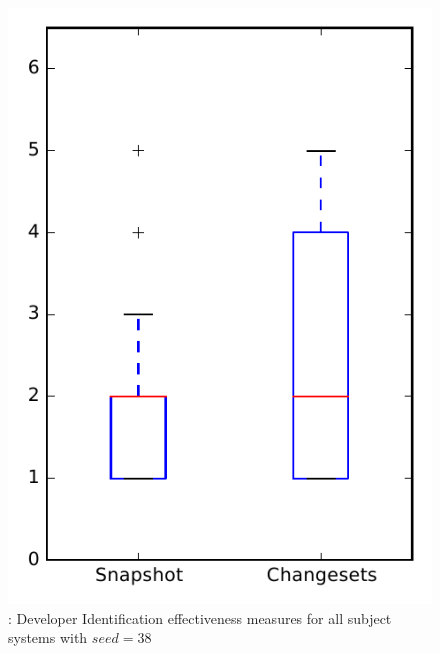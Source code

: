 
\begin{figure}
\centering
\includegraphics[height=0.4\textheight]{figures/dit_seed/rq1_overview_38}
\caption{\rtwo: Developer Identification effectiveness measures for all subject systems with $seed=38$}
\label{fig:dit_seed:rq1:overview}
\end{figure}
